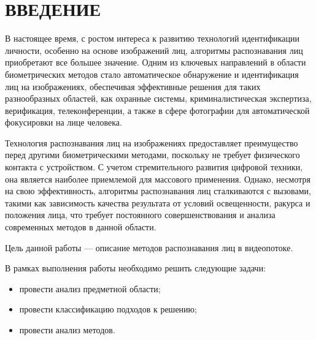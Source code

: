 \chapter*{ВВЕДЕНИЕ}

В настоящее время, с ростом интереса к развитию технологий идентификации 
личности, особенно на основе изображений лиц, алгоритмы распознавания лиц 
приобретают все большее значение. Одним из ключевых направлений в области 
биометрических методов стало автоматическое обнаружение и идентификация 
лиц на изображениях, обеспечивая эффективные решения для таких 
разнообразных областей, как охранные системы, криминалистическая 
экспертиза, верификация, телеконференции, а также в сфере фотографии для 
автоматической фокусировки на лице человека.

Технология распознавания лиц на изображениях предоставляет преимущество 
перед другими биометрическими методами, поскольку не требует физического 
контакта с устройством. С учетом стремительного развития цифровой техники, 
она является наиболее приемлемой для массового применения. Однако, 
несмотря на свою эффективность, алгоритмы распознавания лиц сталкиваются 
с вызовами, такими как зависимость качества результата от условий 
освещенности, ракурса и положения лица, что требует постоянного 
совершенствования и анализа современных методов в данной области.

Цель данной работы --- описание методов распознавания лиц в 
видеопотоке.

В рамках выполнения работы необходимо решить следующие задачи:

\begin{itemize}[label=---]
  \item провести анализ предметной области;
  \item провести классификацию подходов к решению;
  \item провести анализ методов.
\end{itemize}


